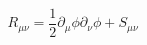 \begin{equation}
\label{eom}
R_{\mu \nu }=\frac{1}{2}\partial _{\mu }\phi \partial _{\nu }\phi +S_{\mu
\nu}
\end{equation}


